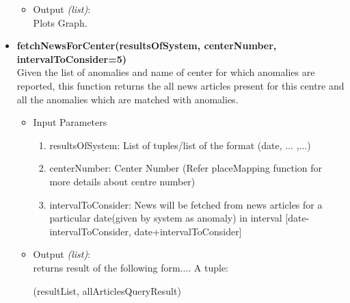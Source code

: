 \begin{itemize}
\begin{itemize}
 \item Output \textit{(list)}: \\
 Plots Graph.
 \end{itemize}
 
 
 \item \textbf{fetchNewsForCenter(resultsOfSystem, centerNumber, intervalToConsider=5)} \\
  
 Given the list of anomalies and name of center for which anomalies are reported, this function returns the all news articles present for this centre and all the anomalies which are matched with anomalies.\\
 
 \begin{itemize}
 \item Input Parameters
 
 \begin{enumerate}
  \item resultsOfSystem: List of tuples/list of the format (date, ... ,...)
  \item centerNumber: Center Number (Refer placeMapping function for more details about centre number)
  \item intervalToConsider: News will be fetched from news articles for a particular date(given by system as anomaly) in interval [date-intervalToConsider, date+intervalToConsider]
 \end{enumerate}

 \item Output \textit{(list)}: \\
 returns result of the following form....
A tuple:

	(resultList, allArticlesQueryResult)
	

\end{itemize}
\end{itemize}
